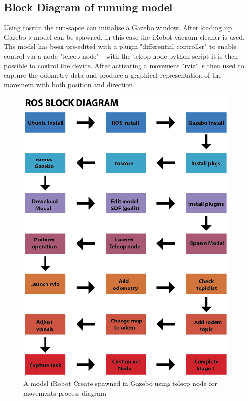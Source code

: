 \documentclass[a4paper, 10pt]{IEEEconf}
\begin{document}

\subsection{Block Diagram of running model}

Using rosrun the run-sapce can initialise a Gazebo window. After loading up Gazebo a model can be spawned, in this case the iRobot vacuum cleaner is used. The model has been pre-edited with a plugin "differential controller" to enable control via a node "teleop node" - with the teleop node python script it is then possible to control the device. After activating a movement "rviz" is then used to capture the odometry data and produce a graphical representation of the movement with both position and direction.

\begin{figure}[H]
  \includegraphics[width=0.8\linewidth, center]{images/Block}
  \caption{A model iRobot Create spawned in Gazebo using teleop node for movements process diagram}
  \label{fig:A model iRobot Create spawned in Gazebo using teleop node for movements process diagram}
\end{figure}
\end{document}
